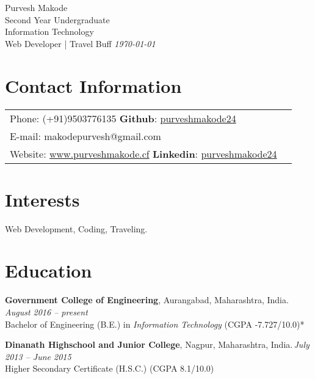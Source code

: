\documentclass[margin,line]{res}
\begin{document}
{\Huge \ttfamily Purvesh Makode} \\
{\small Second Year Undergraduate}\\
{\small Information Technology}\\
{\small Web Developer | Travel Buff} \hspace{11cm} {\em \today}
\vspace{0.03in}
\begin{resume}
\section{\sc Contact Information}



\vspace{.08in}

\begin{tabular} {@{}p{10in}p{1in}}  
             {Phone:}  (+91)9503776135  \hspace{6cm} {\bf Github}: \href{https://github.com/PurveshMakode24}{purveshmakode24}\\ 
		{E-mail:}  makodepurvesh@gmail.com\\
		 {Website:} \url{www.purveshmakode.cf} \hspace{4.73cm} {\bf Linkedin}: \href{https://www.linkedin.com/in/purveshmakode24/}{purveshmakode24}
\end{tabular}


\section{\sc Interests}

Web Development, Coding, Traveling.
\vspace{0.3cm}

\section{\sc Education}
{\bf Government College of Engineering}, Aurangabad, Maharashtra, India.\, \hfill  {\em August 2016 -- present} \\
Bachelor of Engineering (B.E.) in {\em Information Technology } \hfill(CGPA -7.727/10.0)*

{\bf Dinanath Highschool and Junior College}, Nagpur, Maharashtra, India.\,\hfill {\em July 2013 -- June 2015}\\
Higher Secondary Certificate (H.S.C.) \hfill(CGPA 8.1/10.0)
 \vspace{0.4cm}
\iffalse

\end{resume}
\end{document}
